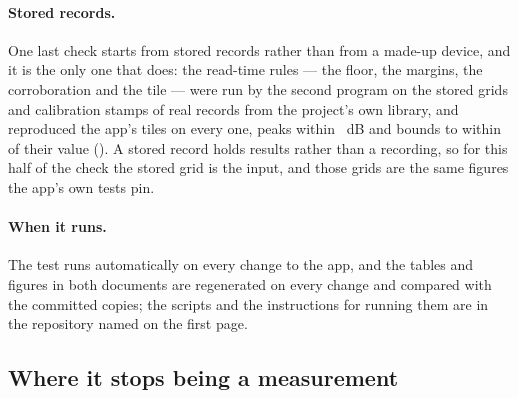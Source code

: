 \documentclass[11pt,a4paper]{article}
\begin{document}
\paragraph{Stored records.} One last check starts from stored records rather than from a made-up
device, and it is the only one that does: the read-time rules --- the
floor, the margins, the corroboration and the tile --- were run by the
second program on the stored grids and calibration stamps of
\gmCorpusRecords{} real records from the project's own library, and
reproduced the app's tiles on every one, \gmCorpusPeaks{} peaks within
\jparityCorpusPeak{}~dB and \gmCorpusBounds{} bounds to within
\jparityCorpusBoundWords{} of their value (\jparityCorpusBound{}). A
stored record holds results rather than a recording, so for this half of
the check the stored grid is the input, and those grids are the same
figures the app's own tests pin.

\paragraph{When it runs.} The test runs automatically on every change to the app, and the tables
and figures in both documents are regenerated on every change and
compared with the committed copies; the scripts and the instructions for
running them are in the repository named on the first page.

\subsection{Where it stops being a measurement}
\end{document}
